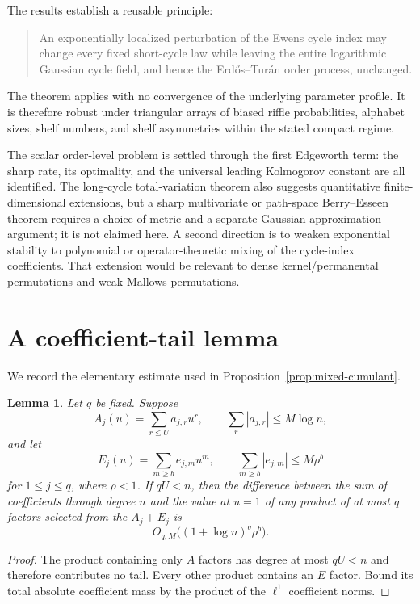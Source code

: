 \documentclass[11pt]{article}
\newtheorem{lemma}[theorem]{Lemma}
\theoremstyle{definition}
\theoremstyle{remark}
\begin{document}
The results establish a reusable principle:

\begin{quote}
An exponentially localized perturbation of the Ewens cycle index may
change every fixed short-cycle law while leaving the entire logarithmic
Gaussian cycle field, and hence the Erd\H{o}s--Tur\'an order process,
unchanged.
\end{quote}

The theorem applies with no convergence of the underlying parameter
profile.  It is therefore robust under triangular arrays of biased riffle
probabilities, alphabet sizes, shelf numbers, and shelf asymmetries within
the stated compact regime.

The scalar order-level problem is settled through the first Edgeworth term:
the sharp rate, its optimality, and the universal leading Kolmogorov
constant are all identified.  The long-cycle total-variation theorem also
suggests quantitative finite-dimensional extensions, but a sharp
multivariate or path-space Berry--Esseen theorem requires a choice of metric
and a separate Gaussian approximation argument; it is not claimed here.
A second direction is to weaken exponential stability to polynomial or
operator-theoretic mixing of the cycle-index coefficients.  That extension
would be relevant to dense kernel/permanental permutations and weak
Mallows permutations.

\appendix

\section{A coefficient-tail lemma}

We record the elementary estimate used in
Proposition~\ref{prop:mixed-cumulant}.

\begin{lemma}\label{lem:coefficient-tail}
Let $q$ be fixed.  Suppose
\[
 A_j(u)=\sum_{r\le U}a_{j,r}u^r,
 \qquad
 \sum_r|a_{j,r}|\le M\log n,
\]
and let
\[
 E_j(u)=\sum_{m\ge b}e_{j,m}u^m,
 \qquad
 \sum_{m\ge b}|e_{j,m}|\le M\rho^b
\]
for $1\le j\le q$, where $\rho<1$.  If $qU<n$, then the difference between
the sum of coefficients through degree $n$ and the value at $u=1$ of any
product of at most $q$ factors selected from the $A_j+E_j$ is
\[
 O_{q,M}\bigl((1+\log n)^q\rho^b\bigr).
\]
\end{lemma}

\begin{proof}
The product containing only $A$ factors has degree at most $qU<n$ and
therefore contributes no tail.  Every other product contains an $E$
factor.  Bound its total absolute coefficient mass by the product of the
$\ell^1$ coefficient norms.
\end{proof}
\end{document}
